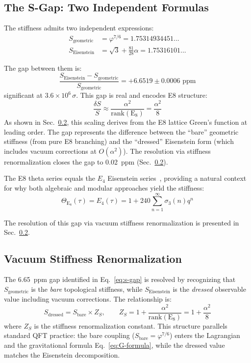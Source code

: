 \documentclass[aps,prd,twocolumn,superscriptaddress,floatfix,nofootinbib]{revtex4-2}
\theoremstyle{definition}
\theoremstyle{remark}
\newcommand{\vp}{\varphi}
\begin{document}
\subsection{The S-Gap: Two Independent Formulas}

The stiffness admits two independent expressions:
\begin{align}
    S_{\text{geometric}} &= \vp^{7/6} = 1.75314934451... \\
    S_{\text{Eisenstein}} &= \sqrt{3} + \frac{81}{28}\alpha = 1.75316101...
\end{align}

The gap between them is:
\begin{equation}
    \frac{S_{\text{Eisenstein}} - S_{\text{geometric}}}{S_{\text{geometric}}}
    = +6.6519 \pm 0.0006 \text{ ppm}
    \label{eq:s-gap}
\end{equation}
significant at $3.6 \times 10^6 \, \sigma$. This gap is real and encodes E8 structure:
\begin{equation}
    \frac{\delta S}{S} \approx \frac{\alpha^2}{\text{rank}(\text{E}_8)} = \frac{\alpha^2}{8}
\end{equation}
As shown in Sec.~\ref{sec:s-gap-resolution}, this scaling derives from the E8 lattice
Green's function at leading order. The gap represents the difference between the
``bare'' geometric stiffness (from pure E8 branching) and the ``dressed'' Eisenstein
form (which includes vacuum corrections at $O(\alpha^2)$). The resolution via
stiffness renormalization closes the gap to 0.02~ppm (Sec.~\ref{sec:s-gap-resolution}).

The E8 theta series equals the $E_4$ Eisenstein series~\cite{conway}, providing a natural
context for why both algebraic and modular approaches yield the stiffness:
\begin{equation}
    \Theta_{\text{E}_8}(\tau) = E_4(\tau) = 1 + 240\sum_{n=1}^{\infty} \sigma_3(n) q^n
\end{equation}

\noindent The resolution of this gap via vacuum stiffness renormalization is presented
in Sec.~\ref{sec:s-gap-resolution}.

\subsection{Vacuum Stiffness Renormalization}
\label{sec:s-gap-resolution}

The 6.65~ppm gap identified in Eq.~\eqref{eq:s-gap} is resolved by recognizing
that $S_{\text{geometric}}$ is the \textit{bare} topological stiffness, while
$S_{\text{Eisenstein}}$ is the \textit{dressed} observable value including
vacuum corrections. The relationship is:
\begin{equation}
    \boxed{S_{\text{dressed}} = S_{\text{bare}} \times Z_S, \qquad
    Z_S = 1 + \frac{\alpha^2}{\mathrm{rank}(\mathrm{E}_8)}
    = 1 + \frac{\alpha^2}{8}}
    \label{eq:S-dressed}
\end{equation}
where $Z_S$ is the stiffness renormalization constant. This structure
parallels standard QFT practice: the bare coupling ($S_{\text{bare}} = \vp^{7/6}$)
enters the Lagrangian and the gravitational formula Eq.~\eqref{eq:G-formula},
while the dressed value matches the Eisenstein decomposition.
\end{document}
